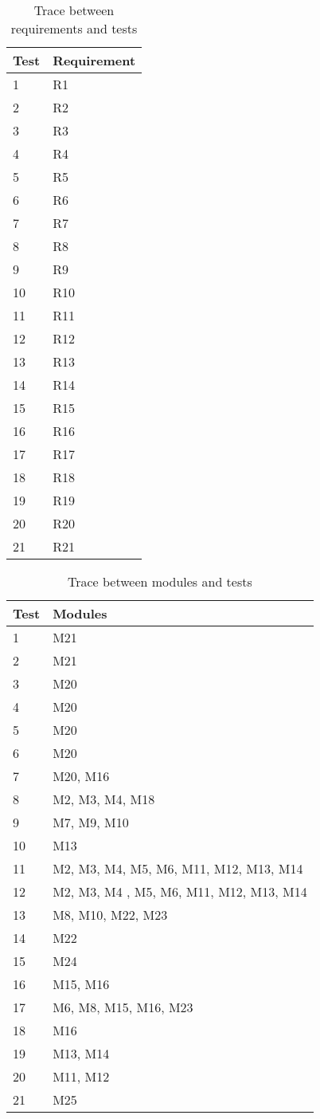 \documentclass[12pt, titlepage]{article}
\begin{document}
\begin{table}[h]
\caption{Trace between requirements and tests} \label{tab:tracereq}
\centering
\begin{tabularx}{0.55\textwidth}{p{4cm}X}
\toprule {\bf Test} & {\bf Requirement}\\
\midrule
1	&	R1	\\
2	&	R2	\\
3	&	R3	\\
4	&	R4	\\
5	&	R5	\\
6	&	R6	\\
7	&	R7	\\
8	&	R8	\\
9	&	R9\\
10	&	R10	\\
11	&	R11	\\
12	&	R12	\\
13	&	R13	\\
14	&	R14	\\
15	&	R15	\\
16	&	R16	\\
17	&	R17	\\
18	&	R18	\\
19	&	R19	\\
20	&	R20	\\
21	&	R21	\\
\bottomrule
\end{tabularx}
\end{table}

\begin{table}[ht]
\caption{Trace between modules and tests} \label{tab:tracemod}
\centering
\begin{tabularx}{1.05\textwidth}{p{5cm}X}
\toprule {\bf Test} & {\bf Modules}\\
\midrule
1	&	M21	\\
2	&	M21	\\
3	&	M20	\\
4	&	M20\\
5	&	M20	\\
6	&	M20	\\
7	&	M20, M16	\\
8	&	M2, M3, M4, M18	\\
9	&	M7, M9, M10\\
10	&	M13	\\
11	&	M2, M3, M4, M5, M6, M11, M12, M13, M14	\\
12	&	M2, M3, M4 , M5, M6, M11, M12, M13, M14	\\
13	&	M8, M10, M22, M23	\\
14	&	M22	\\
15	&	M24	\\
16	&	M15, M16	\\
17	&	M6, M8, M15, M16, M23	\\
18	&	M16	\\
19	&	M13, M14	\\
20	&	M11, M12\\
21	&	M25\\
\bottomrule
\end{tabularx}
\end{table}	
\end{document}
